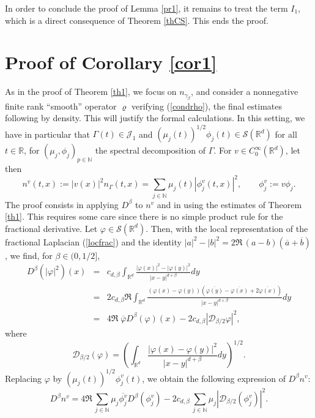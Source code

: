 \documentclass[12pt]{article}
\def \Rm {\mathbb R}
\def \Nm {\mathbb N}
\newcommand{\calS}{\mathcal S}
\newcommand{\calJ}{\mathcal J}
\newcommand{\calD}{\mathcal D}
\def\fref#1{{\rm (\ref{#1})}}
\newcommand{\bee}{\begin{eqnarray*}}
\newcommand{\eee}{\end{eqnarray*}}
\begin{document}
In order to conclude the proof of Lemma \ref{pr1}, it remains to treat the term $I_1$, which is a direct consequence of Theorem \ref{thCS}. This ends the proof.

\section{Proof of Corollary \ref{cor1}} \label{proofcor}
As in the proof of Theorem \ref{th1}, we focus on $n_{\gamma_\beta}$, and consider a nonnegative finite rank ``smooth'' operator $\varrho$ verifying \fref{condrho}, the final estimates following by density. This will justify the formal calculations. In this setting,  we have in particular that $\Gamma (t) \in \calJ_1$ and $(\mu_j(t))^{1/2}\phi_j(t) \in \calS(\Rm^d)$ for all $t \in \Rm$, for $(\mu_j,\phi_j)_{p\in \Nm}$ the spectral decomposition of $\Gamma$. For $v\in C_0^\infty(\Rm^d)$, let then 
$$
n^v(t,x):=|v(x)|^2 n_{\Gamma}(t,x)=\sum_{j\in \Nm} \mu_j(t) |\phi^v_j(t,x)|^2, \qquad \phi^v_j:=v \phi_j.
$$
The proof consists in applying $D^\beta$ to $n^v$ and in using the estimates of Theorem \ref{th1}. This requires some care since there is no simple product rule for the fractional derivative. Let $\varphi \in \calS(\Rm^d)$. Then,
with the local representation of the fractional Laplacian \fref{locfrac} and the identity $|a|^2-|b|^2= 2\Re\, (a-b)(\overline{a}+\overline{b})$, we find, for $\beta \in (0,1/2]$,
\bee
D^\beta(|\varphi|^2)(x)&=&c_{d,\beta} \int_{\Rm^d} \frac{|\varphi(x)|^2-|\varphi(y)|^2}{|x-y|^{d+\beta}}dy\\
&=&2 c_{d,\beta} \Re\int_{\Rm^d} \frac{(\varphi(x)-\varphi(y))(\overline{\varphi(y)}-\overline{\varphi(x)}+2\overline{\varphi(x)} )}{|x-y|^{d+\beta}}dy\\[2mm]
&=&4 \Re \; \overline{\varphi} D^\beta(\varphi)(x)-2 c_{d,\beta} |\calD_{\beta/2}\varphi|^2,
\eee
where
$$
\calD_{\beta/2}(\varphi)=\left(\int_{\Rm^d} \frac{|\varphi(x)-\varphi(y)|^2}{|x-y|^{d+\beta}}dy\right)^{1/2}.
$$
Replacing $\varphi$ by $ (\mu_j(t))^{1/2}\phi_j^v(t)$, we obtain the following expression of $D^\beta n^v$:
$$
D^\beta n^v= 4 \Re \, \sum_{j\in \Nm} \mu_j\overline{\phi^v_j} D^\beta(\phi^v_j)-2 c_{d,\beta} \, \sum_{j\in \Nm} \mu_j |\calD_{\beta/2}(\phi^v_j)|^2.
$$
\end{document}
